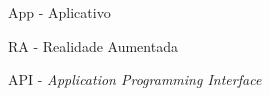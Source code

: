\listoffigures*

\newpage
{}
\newpage
\listoftables*
\cleardoublepage

\begin{siglas}
  \item App - Aplicativo
  \item RA - Realidade Aumentada
  \item API - \textit{Application Programming Interface}
\end{siglas}


\tableofcontents*
\cleardoublepage

